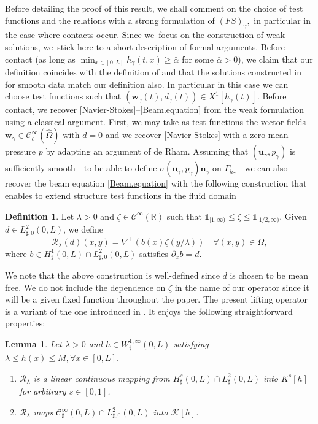 \documentclass[10pt]{amsart}
\let\mathcal\mathscr
\newtheorem{lemma}[theorem]{Lemma}
\theoremstyle{remark}
\theoremstyle{definition}
\newtheorem{definition}[theorem]{Definition}
\newcommand{\ug}{\boldsymbol{u}}
\newcommand{\wg}{\boldsymbol{w}}
\newcommand{\BS}[1]{\boldsymbol{#1}}
\begin{document}
Before detailing the proof of this result, we shall comment on the choice of test functions and the relations with a strong formulation of $(FS)_\gamma,$ in particular in the case where contacts occur. Since we~focus on the construction of weak solutions, we~stick here to a short description of formal arguments. Before contact (\ie as long as $\min_{x \in [0,L]} h_\gamma(t,x) \geq \bar{\alpha}$ for some $\bar{\alpha} >0$), we claim that our definition coincides with the definition of \cite{Chambolle-etal} and that the solutions constructed in \cite{Grandmont-Hillairet} for smooth data match our definition also. In particular in this case we can choose test functions such that $(\wg_\gamma(t), d_\gamma(t))\in X^1[h_\gamma(t)]$. Before contact,
we recover \eqref{Navier-Stokes}--\eqref{Beam.equation} from the weak formulation using a classical argument. First, we may take as
test functions the vector fields $\wg_\gamma \in \mathcal{C}^{\infty}_c(\hat \Omega)$ with $d = 0$ and we recover \eqref{Navier-Stokes} with a zero mean pressure $p$ by adapting an argument of de Rham. Assuming that
$(\ug_\gamma,p_\gamma)$ is sufficiently smooth---to be able to define $\sigma(\ug_\gamma,p_\gamma) \BS{n}_{\gamma}$
on $\Gamma_{h_{\gamma}}$---we can also recover the beam equation \eqref{Beam.equation} with the following construction that enables to extend structure test functions in the fluid domain

\begin{definition}
\label{def:R}
Let $\lambda >0$ and $\zeta \in \mathcal{C}^{\infty}(\mathbb R)$ such that
$\mathds{1}_{[1,\infty)} \leq \zeta \leq \mathds{1}_{[1/2,\infty)}. $
Given $d\in L_{\sharp,0}^2(0, L)$, we define
\[
\mathcal{R}_\lambda(d)(x,y)= \nabla^{\bot} (b(x) \zeta(y/\lambda)) \quad
\forall (x,y) \in \Omega,
\]
where $b \in H^{1}_{\sharp}(0,L) \cap L^2_{\sharp,0}(0,L)$ satisfies
$\partial_x b = d$.
\end{definition}

We note that the above construction is well-defined since $d$ is chosen to be mean free. We do not include the dependence on $\zeta$ in the name of our operator since it will be a given fixed function throughout the paper. The present lifting operator is a variant of the one introduced in \cite{Chambolle-etal}. It enjoys the following straightforward properties:

\begin{lemma}
Let $\lambda >0$ and $h\in W^{1, \infty}_\sharp(0, L)$ satisfying
$\lambda\leq h(x)\leq M, \forall x\in [0, L]$.
\begin{enumerate}
\item $\mathcal R_{\lambda}$ is a linear continuous mapping from $H^s_{\sharp}(0,L) \cap L^2_{\sharp}(0,L)$ into $K^s[h]$ for arbitrary $s \in [0,1]$.
\item $\mathcal R_{\lambda}$ maps $\mathcal{C}^{\infty}_{\sharp}(0,L) \cap L^2_{\sharp,0}(0,L)$
into $\mathcal K[h]$.
\end{enumerate}
\end{lemma}
\end{document}
